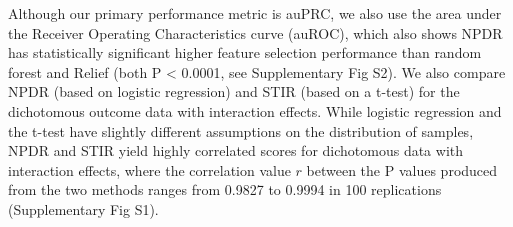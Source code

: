 \documentclass[10pt]{article}
\begin{document}

Although our primary performance metric is auPRC, we also use the area under the Receiver Operating Characteristics curve (auROC), which also shows NPDR has statistically significant higher feature selection performance than random forest and Relief (both P < 0.0001, see Supplementary Fig S2). We also compare NPDR (based on logistic regression) and STIR (based on a t-test) for the dichotomous outcome data with interaction effects.
While logistic regression and the t-test have slightly different assumptions on the distribution of samples, NPDR and STIR yield highly correlated scores for dichotomous data with interaction effects, where the correlation value $r$ between the P values produced from the two methods ranges from 0.9827 to 0.9994 in 100 replications (Supplementary Fig S1). 
\end{document}
